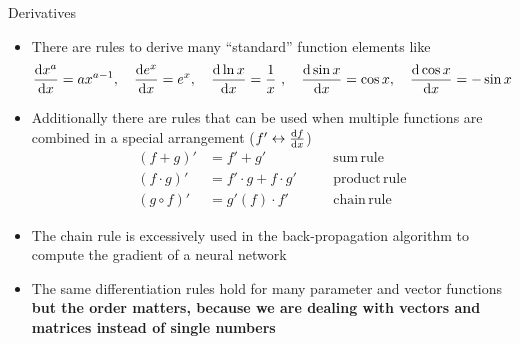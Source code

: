   \begin{frame}{Derivatives}
    \begin{itemize}
      \item There are rules to derive many \enquote{standard} function elements like
      \begin{equation*}
        \dderiv{x^a}{x} = ax^{a-1} ,\quad \dderiv{e^x}{x} = e^x ,\quad \dderiv{\ln x}{x} = \frac{1}{x} ,\quad \dderiv{\sin x}{x} = \cos{x} ,\quad \dderiv{\cos x}{x} = -\sin x
      \end{equation*}
      \item Additionally there are rules that can be used when multiple functions are combined in a special arrangement ($f' \leftrightarrow \frac{\mathrm{d}f}{\mathrm{d}x}$)
      \begin{align*}
        (f + g)' &= f' + g' &&\quad\mathrm{sum\,rule} \\
        (f \cdot g)' &= f' \cdot g + f \cdot g' &&\quad\mathrm{product\,rule} \\
        (g \circ f)' &= g'(f) \cdot f' &&\quad\mathrm{chain\,rule}
      \end{align*}
      \item The chain rule is excessively used in the back-propagation algorithm to compute the gradient of a neural network
      \item The same differentiation rules hold for many parameter and vector functions \textbf{but the order matters, because we are dealing with vectors and matrices instead of single numbers}
    \end{itemize}
  \end{frame}

